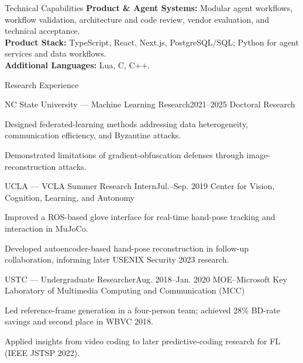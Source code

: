 \documentclass{resume}
\begin{document}
\begin{rSection}{Technical Capabilities}
    \textbf{Product \& Agent Systems:} Modular agent workflows, workflow validation,
    architecture and code review, vendor evaluation, and technical acceptance.\\
    \textbf{Product Stack:} TypeScript, React, Next.js, PostgreSQL/SQL;
    Python for agent services and data workflows.\\
    \textbf{Additional Languages:} Lua, C, C++.
\end{rSection}

\newpage

\begin{rSection}{Research Experience}
    \begin{rSubsection}{NC State University --- Machine Learning Research}{2021--2025}
        {Doctoral Research}{}
        \item Designed federated-learning methods addressing data heterogeneity, communication efficiency, and Byzantine attacks.
        \item Demonstrated limitations of gradient-obfuscation defenses through image-reconstruction attacks.
    \end{rSubsection}

    \begin{rSubsection}{UCLA --- VCLA Summer Research Intern}{Jul.--Sep. 2019}
        {Center for Vision, Cognition, Learning, and Autonomy}{}
        \item Improved a ROS-based glove interface for real-time hand-pose tracking and interaction in MuJoCo.
        \item Developed autoencoder-based hand-pose reconstruction in follow-up collaboration, informing later USENIX Security 2023 research.
    \end{rSubsection}

    \begin{rSubsection}{USTC --- Undergraduate Researcher}{Aug. 2018--Jan. 2020}
        {MOE--Microsoft Key Laboratory of Multimedia Computing and Communication (MCC)}{}
        \item Led reference-frame generation in a four-person team; achieved 28\% BD-rate savings and second place in WBVC 2018.
        \item Applied insights from video coding to later predictive-coding research for FL (IEEE JSTSP 2022).
    \end{rSubsection}
\end{rSection}
\end{document}
